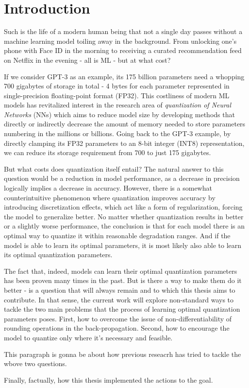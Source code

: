 \chapter{Introduction\label{cha:chapter1}}

\hspace{1em}Such is the life of a modern human being that not a single day passes 
without a machine learning model toiling away in the background. 
From unlocking one's phone with Face ID in the morning 
to receiving a curated recommendation feed on Netflix in the evening - 
all is ML - but at what cost?

If we consider GPT-3 as an example, 
its 175 billion parameters need a whopping 700 gigabytes of storage in total - 
4 bytes for each parameter represented in single-precision floating-point format (FP32).
This costliness of modern ML models has revitalized interest in the research area
of \textit{quantization of Neural Networks} (NNs) 
which aims to reduce model size by developing methods 
that directly or indirectly decrease the amount of memory 
needed to store parameters numbering in the millions or billions. 
Going back to the GPT-3 example, by directly clamping its FP32 parameters 
to an 8-bit integer (INT8) representation, we can reduce its storage requirement 
from 700 to just 175 gigabytes. 

But what costs does quantization itself entail? The natural answer to this question 
would be a reduction in model performance, as a decrease in precision logically implies 
a decrease in accuracy. However, there is a somewhat counterintuitive phenomenon where 
quantization improves accuracy by introducing discretization effects, which act like a
form of regularization, forcing the model to generalize better. No matter whether quantization
results in better or a slightly worse performance, the conclusion is that 
for each model there is an optimal way to quantize it within reasonable degradation ranges.
And if the model is able to learn its optimal parameters, 
it is most likely also able to learn its optimal quantization parameters. 

The fact that, indeed, models can learn their optimal quantization parameters has been proven 
many times in the past. But is there a way to make them do it better - is a question 
that will always remain and to which this thesis aims to contribute. In that sense, 
the current work will explore non-standard ways to tackle the two main problems that the process 
of learning optimal quantization parameters poses. First, how to overcome the issue 
of non-differentiability of rounding operations in the back-propagation. Second, how
to encourage the model to quantize only where it's necessary and feasible. 


This paragraph is gonna be about how previous reseacrh has tried to tackle the wbove two questions.


Finally, factually, how this thesis implemented the actions to the goal.